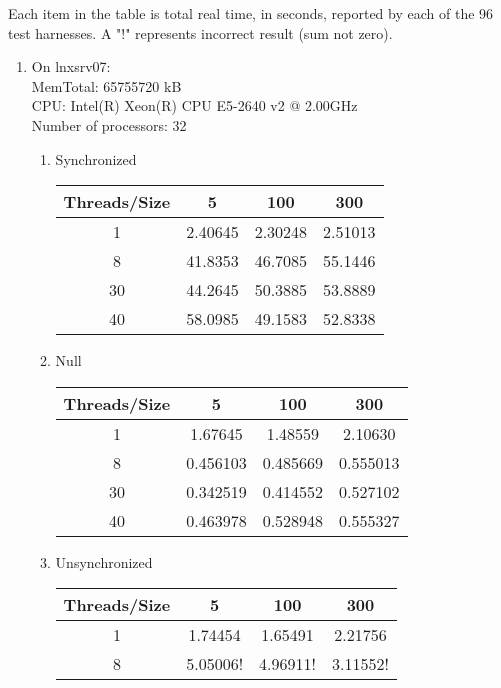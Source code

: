 \documentclass[letterpaper,twocolumn,10pt]{article}
\begin{document}
Each item in the table is total real time, in seconds, reported by each of the 96 test harnesses.
A "!" represents incorrect result (sum not zero).
\begin{enumerate}
  \item   
  On lnxsrv07: \\
  MemTotal:       65755720 kB \\
  CPU: Intel(R) Xeon(R) CPU E5-2640 v2 @ 2.00GHz\\
  Number of processors: 32 \\
  \begin{enumerate}
    \item 
    Synchronized
    \begin{center}
      \begin{tabular}{|c|c|c|c|}
      \hline
        Threads/Size & 5 & 100 & 300 \\
      \hline 1 & 2.40645 & 2.30248 & 2.51013 \\
      \hline 8 & 41.8353 & 46.7085 & 55.1446 \\
      \hline 30 & 44.2645 & 50.3885 & 53.8889 \\
      \hline 40 & 58.0985 & 49.1583 & 52.8338 \\
      \hline
      \end{tabular}
    \end{center}
    \item 
    Null
    \begin{center}
      \begin{tabular}{|c|c|c|c|}
      \hline
        Threads/Size & 5 & 100 & 300 \\
      \hline 1 & 1.67645 & 1.48559 & 2.10630 \\
      \hline 8 & 0.456103 & 0.485669 & 0.555013 \\
      \hline 30 & 0.342519 & 0.414552 & 0.527102 \\
      \hline 40 & 0.463978 & 0.528948 & 0.555327 \\
      \hline
      \end{tabular}
    \end{center}
    \item 
    Unsynchronized
    \begin{center}
      \begin{tabular}{|c|c|c|c|}
      \hline
        Threads/Size & 5 & 100 & 300 \\
      \hline 1 & 1.74454 & 1.65491 & 2.21756 \\
      \hline 8 & 5.05006! & 4.96911! & 3.11552! \\

\end{tabular}
\end{center}
\end{enumerate}
\end{enumerate}
\end{document}
